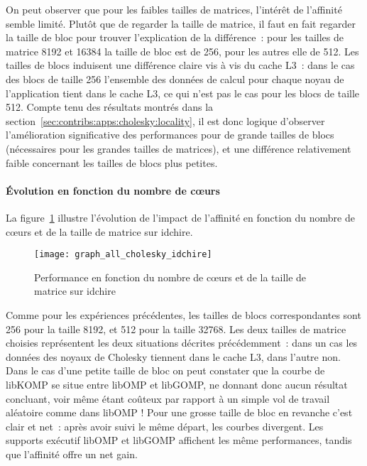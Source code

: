 On peut observer que pour les faibles tailles de matrices, l'intérêt de l'affinité semble limité.
Plutôt que de regarder la taille de matrice, il faut en fait regarder la taille de bloc pour trouver l'explication de la différence~: pour les tailles de matrice 8192 et 16384 la taille de bloc est de 256, pour les autres elle de 512.
Les tailles de blocs induisent une différence claire vis à vis du cache L3~: dans le cas des blocs de taille 256 l'ensemble des données de calcul pour chaque noyau de l'application tient dans le cache L3, ce qui n'est pas le cas pour les blocs de taille 512.
Compte tenu des résultats montrés dans la section~\ref{sec:contribs:apps:cholesky:locality}, il est donc logique d'observer l'amélioration significative des performances pour de grande tailles de blocs (nécessaires pour les grandes tailles de matrices), et une différence relativement faible concernant les tailles de blocs plus petites.


\paragraph{Évolution en fonction du nombre de cœurs}

La figure~\ref{fig:contribs:perf_eval:eval-cholesky-idchire} illustre l'évolution de l'impact de l'affinité en fonction du nombre de cœurs et de la taille de matrice sur idchire.


\begin{figure}[ht]
  \centering
  \texttt{[image: graph\_all\_cholesky\_idchire]}
  \caption{Performance en fonction du nombre de cœurs et de la taille de matrice sur idchire}\label{fig:contribs:perf_eval:eval-cholesky-idchire}
\end{figure}

Comme pour les expériences précédentes, les tailles de blocs correspondantes sont 256 pour la taille 8192, et 512 pour la taille 32768.
Les deux tailles de matrice choisies représentent les deux situations décrites précédemment~: dans un cas les données des noyaux de Cholesky tiennent dans le cache L3, dans l'autre non.
Dans le cas d'une petite taille de bloc on peut constater que la courbe de libKOMP se situe entre libOMP et libGOMP, ne donnant donc aucun résultat concluant, voir même étant coûteux par rapport à un simple vol de travail aléatoire comme dans libOMP !
Pour une grosse taille de bloc en revanche c'est clair et net~: après avoir suivi le même départ, les courbes divergent. Les supports exécutif libOMP et libGOMP affichent les même performances, tandis que l'affinité offre un net gain.

